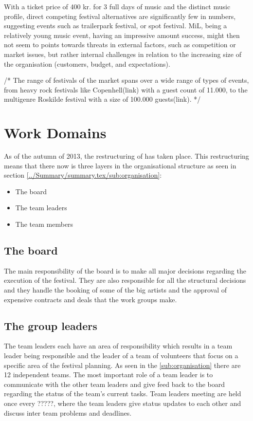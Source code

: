 \bigskip

With a ticket price of 400 kr. for 3 full days of music and the distinct music profile, direct competing festival alternatives are significantly few in numbers, suggesting events such as trailerpark festival, or spot festival. MiL, being a relatively young music event, having an impressive amount success, might then not seem to points towards threats in external factors, such as competition or market issues, but rather internal challenges in relation to the increasing size of the organisation (customers, budget, and expectations). 

\bigskip

/*
The range of festivals of the market spans over a wide range of types of events, from heavy rock festivals like Copenhell(link) with a guest count of 11.000, to the multigenre Roskilde festival with a size of 100.000 guests(link). 
*/


\section{Work Domains}
\label{sec:work_domains}
As of the autumn of 2013, the restructuring of \mil has taken place. This restructuring means
that there now is three layers in the organisational structure as seen in section
\ref{../Summary/summary.tex/sub:organisation}:
\begin{itemize}
    \item The board
    \item The team leaders
    \item The team members
\end{itemize}
\subsection{The board}
\label{sub:the_board}
The main responsibility of the board is to make all major decisions regarding the execution of the
festival. They are also responsible for all the structural decisions and they handle the booking of
some of the big artists and the approval of expensive contracts and deals that the work groups make.

\subsection{The group leaders}
\label{sub:group_leaders}
The team leaders each have an area of responsibility which results in a team leader being
responsible and the leader of a team of volunteers that focus on a specific area of the festival
planning. As seen in the \ref{sub:organisation} there are 12 independent teams. The most important
role of a team leader is to communicate with the other team leaders and give feed back to the board
regarding the status of the team's current tasks. Team leaders meeting are held once every ?????,
where the team leaders give status updates to each other and discuss inter team problems and
deadlines.

